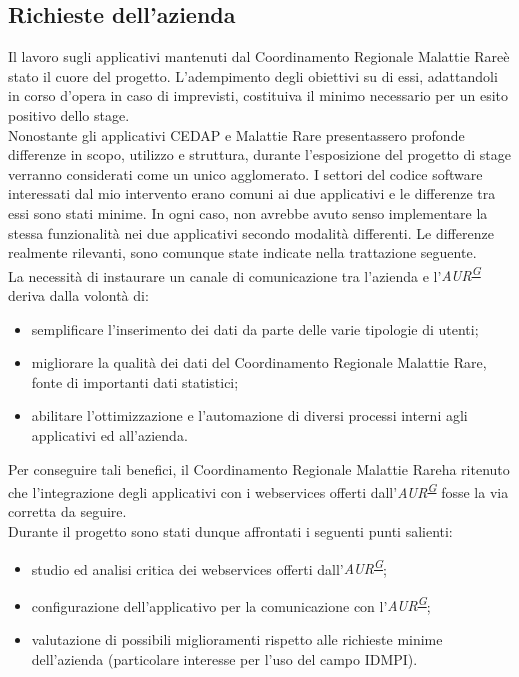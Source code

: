 \documentclass[a4paper]{article}
\newcommand{\crmr}{Coordinamento Regionale Malattie Rare}
\begin{document}
\subsection{Richieste dell'azienda}
Il lavoro sugli applicativi mantenuti dal \crmr è stato il cuore del progetto. L'adempimento degli obiettivi su di essi, adattandoli in corso d'opera in caso di imprevisti, costituiva il minimo necessario per un esito positivo dello stage.
\\
Nonostante gli applicativi CEDAP e Malattie Rare presentassero profonde differenze in scopo, utilizzo e struttura, durante l'esposizione del progetto di stage verranno considerati come un unico agglomerato. I settori del codice software interessati dal mio intervento erano comuni ai due applicativi e le differenze tra essi sono stati minime. In ogni caso, non avrebbe avuto senso implementare la stessa funzionalità nei due applicativi secondo modalità differenti. Le differenze realmente rilevanti, sono comunque state indicate nella trattazione seguente.
\\
La necessità di instaurare un canale di comunicazione tra l'azienda e l'\textit{AUR\textsuperscript{\hyperref[sec:gl]{G}}} deriva dalla volontà di:
\begin{itemize}
	\item semplificare l’inserimento dei dati da parte delle varie tipologie di utenti;
    \item migliorare la qualità dei dati del \crmr, fonte di importanti dati statistici;
    \item abilitare l’ottimizzazione e l’automazione di diversi processi interni agli applicativi ed all'azienda.
\end{itemize}
Per conseguire tali benefici, il \crmr ha ritenuto che l'integrazione degli applicativi con i webservices offerti dall'\textit{AUR\textsuperscript{\hyperref[sec:gl]{G}}} fosse la via corretta da seguire.
\\
Durante il progetto sono stati dunque affrontati i seguenti punti salienti:
\begin{itemize}
	\item studio ed analisi critica dei webservices offerti dall'\textit{AUR\textsuperscript{\hyperref[sec:gl]{G}}};
    \item configurazione dell'applicativo per la comunicazione con l'\textit{AUR\textsuperscript{\hyperref[sec:gl]{G}}};
    \item valutazione di possibili miglioramenti rispetto alle richieste minime dell'azienda (particolare interesse per l'uso del campo IDMPI).
\end{itemize}
\end{document}
